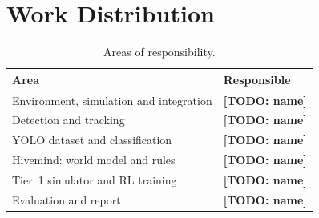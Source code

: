 \documentclass{article}
\newcommand{\todo}[1]{\textbf{[TODO: #1]}}
\begin{document}
\section{Work Distribution}
\begin{table}[H]
\centering
\begin{tabular}{|l|l|}
\hline
\textbf{Area} & \textbf{Responsible} \\ \hline
Environment, simulation and integration & \todo{name} \\ \hline
Detection and tracking                  & \todo{name} \\ \hline
YOLO dataset and classification         & \todo{name} \\ \hline
Hivemind: world model and rules         & \todo{name} \\ \hline
Tier~1 simulator and RL training        & \todo{name} \\ \hline
Evaluation and report                   & \todo{name} \\ \hline
\end{tabular}
\caption{Areas of responsibility.}
\end{table}
\end{document}
